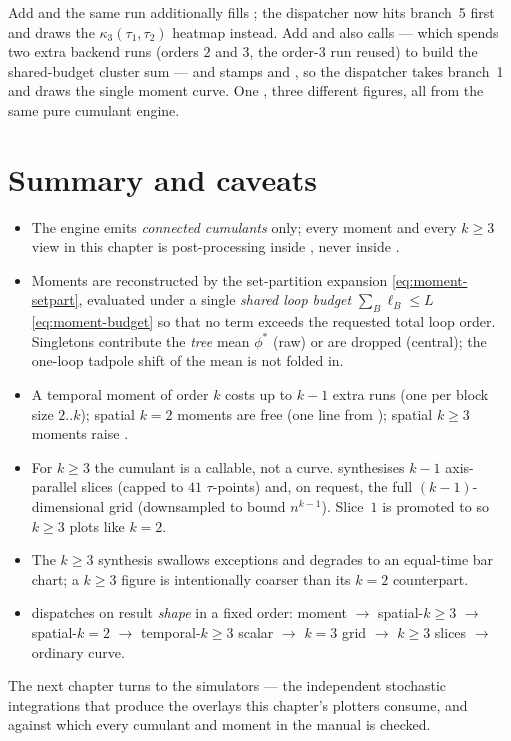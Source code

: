 Add  and the same run additionally fills
; the dispatcher now hits branch~5 first and draws the
$\kappa_3(\tau_1,\tau_2)$ heatmap instead. Add  and
 also calls  --- which spends two extra
backend runs (orders $2$ and $3$, the order-$3$ run reused) to build the
shared-budget cluster sum --- and stamps  and
, so the dispatcher takes branch~1 and draws the single
moment curve. One , three different figures, all from the same pure
cumulant engine.

\section{Summary and caveats}

\begin{itemize}
  \item The engine emits \emph{connected cumulants} only; every moment and every
        $k\ge3$ view in this chapter is post-processing inside
        , never inside .
  \item Moments are reconstructed by the set-partition expansion
        \eqref{eq:moment-setpart}, evaluated under a single \emph{shared loop
        budget} $\sum_B\ell_B\le L$ \eqref{eq:moment-budget} so that no term
        exceeds the requested total loop order. Singletons contribute the
        \emph{tree} mean $\phi^{*}$ (raw) or are dropped (central); the one-loop
        tadpole shift of the mean is not folded in.
  \item A temporal moment of order $k$ costs up to $k-1$ extra
         runs (one per block size $2..k$); spatial $k=2$
        moments are free (one line from ); spatial $k\ge3$ moments
        raise .
  \item For $k\ge3$ the cumulant is a callable, not a curve.  synthesises
        $k-1$ axis-parallel slices (capped to $41$ $\tau$-points) and, on request,
        the full $(k-1)$-dimensional grid (downsampled to bound $n^{k-1}$). Slice~$1$
        is promoted to  so $k\ge3$ plots like $k=2$.
  \item The $k\ge3$ synthesis swallows exceptions and degrades to an equal-time bar
        chart; a $k\ge3$ figure is intentionally coarser than its $k=2$ counterpart.
  \item {} dispatches on result \emph{shape} in a fixed order:
        moment $\to$ spatial-$k\ge3$ $\to$ spatial-$k=2$ $\to$ temporal-$k\ge3$
        scalar $\to$ $k=3$ grid $\to$ $k\ge3$ slices $\to$ ordinary curve.
\end{itemize}

The next chapter turns to the simulators --- the independent stochastic
integrations that produce the  overlays this chapter's plotters consume,
and against which every cumulant and moment in the manual is checked.
